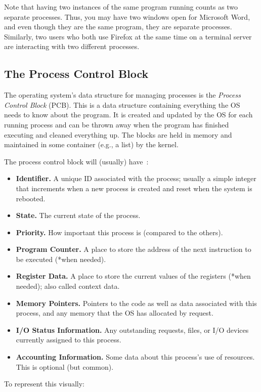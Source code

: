 Note that having two instances of the same program running counts as two separate processes. Thus, you may have two windows open for Microsoft Word, and even though they are the same program, they are separate processes. Similarly, two users who both use Firefox at the same time on a terminal server are interacting with two different processes.

\subsection*{The Process Control Block}
The operating system's data structure for managing processes is the \textit{Process Control Block} (PCB). This is a data structure containing everything the OS needs to know about the program. It is created and updated by the OS for each running process and can be thrown away when the program has finished executing and cleaned everything up. The blocks are held in memory and maintained in some container (e.g., a list) by the kernel.

The process control block will (usually) have~\cite{osi}:
\begin{itemize}
	\item \textbf{Identifier.} A unique ID associated with the process; usually a simple integer that increments when a new process is created and reset when the system is rebooted.
	\item \textbf{State.} The current state of the process.
	\item \textbf{Priority.} How important this process is (compared to the others).
	\item \textbf{Program Counter.} A place to store the address of the next instruction to be executed (*when needed).
	\item \textbf{Register Data.} A place to store the current values of the registers (*when needed); also called context data.
	\item \textbf{Memory Pointers.} Pointers to the code as well as data associated with this process, and any memory that the OS has allocated by request.
	\item \textbf{I/O Status Information.} Any outstanding requests, files, or I/O devices currently assigned to this process.
	\item \textbf{Accounting Information.} Some data about this process's use of resources. This is optional (but common).
\end{itemize}

To represent this visually:

